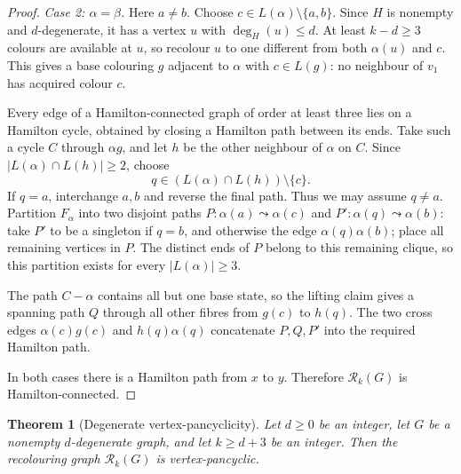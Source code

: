 \documentclass[11pt]{article}
\newtheorem{theorem}{Theorem}[section]
\theoremstyle{remark}
\newcommand{\Rk}{\mathcal R_k}
\numberwithin{equation}{section}
\numberwithin{table}{section}
\begin{document}
\begin{proof}
\smallskip

\noindent\textit{Case 2: $\alpha=\beta$.}
Here $a\ne b$. Choose $c\in L(\alpha)\setminus\{a,b\}$.
Since $H$ is nonempty and $d$-degenerate, it has a vertex $u$ with
$\deg_H(u)\le d$. At least $k-d\ge3$ colours are available at $u$,
so recolour $u$ to one different from both $\alpha(u)$ and $c$.
This gives a base colouring $g$ adjacent to $\alpha$ with
$c\in L(g)$: no neighbour of $v_1$ has acquired colour $c$.

Every edge of a Hamilton-connected graph of order at least three lies
on a Hamilton cycle, obtained by closing a Hamilton path between its
ends. Take such a cycle $C$ through $\alpha g$, and let $h$ be the
other neighbour of $\alpha$ on $C$. Since
$|L(\alpha)\cap L(h)|\ge2$, choose
\[
q\in (L(\alpha)\cap L(h))\setminus\{c\}.
\]
If $q=a$, interchange $a,b$ and reverse the final path. Thus we may
assume $q\ne a$. Partition $F_\alpha$ into two disjoint paths
$P:\alpha(a)\leadsto\alpha(c)$ and
$P':\alpha(q)\leadsto\alpha(b)$: take $P'$ to be a singleton if
$q=b$, and otherwise the edge $\alpha(q)\alpha(b)$; place all
remaining vertices in $P$. The distinct ends of $P$ belong to this
remaining clique, so this partition exists for every $|L(\alpha)|\ge3$.

The path $C-\alpha$ contains all but one base state, so the lifting
claim gives a spanning path $Q$ through all other fibres from $g(c)$
to $h(q)$. The two cross edges
$\alpha(c)g(c)$ and $h(q)\alpha(q)$ concatenate $P,Q,P'$ into the
required Hamilton path.

In both cases there is a Hamilton path from $x$ to $y$. Therefore $\Rk(G)$ is Hamilton-connected.
\end{proof}

\begin{theorem}[Degenerate vertex-pancyclicity]\label{thm:degenerate-vp}
Let $d\ge0$ be an integer, let $G$ be a nonempty $d$-degenerate graph,
and let $k\ge d+3$ be an integer.
Then the recolouring graph $\Rk(G)$ is vertex-pancyclic.

\end{theorem}
\end{document}
